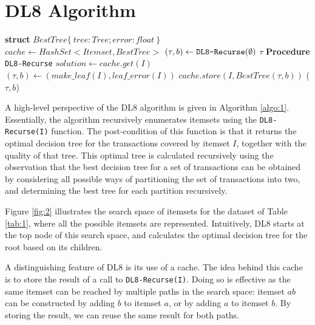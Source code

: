 \section{DL8 Algorithm}
\begin{algorithm}
	\DontPrintSemicolon
	\caption{$DL8(maxdepth, minsup)$}
	\label{algo:1}
	\textbf{struct} $BestTree\{\ tree : Tree; error : float\ \}$\;
	$cache \gets HashSet < Itemset, BestTree >$\;
	$(\tau, b) \gets \verb|DL8-Recurse|(\emptyset)$\;
	\Return $\tau$\;
	\textbf{Procedure} \texttt{DL8-Recurse}\;
		$solution \gets cache.get(I)$\;
		$(\tau, b) \gets (make\_leaf(I), leaf\_error (I))$\;
		$cache.store(I, BestT ree(\tau, b))$\;
		\Return($\tau, b$)\;
\end{algorithm}

A high-level perspective of the DL8 algorithm is given in Algorithm \ref{algo:1}. Essentially, the algorithm recursively enumerates itemsets using the \verb|DL8-Recurse(I)| function. The post-condition of this function is that it returns the optimal decision tree for the transactions covered by itemset $I$, together with the quality of that tree. This optimal tree is calculated recursively using the observation that the best decision tree for a set of transactions can be obtained by considering all possible ways of partitioning the set of transactions into two, and determining the best tree for each partition recursively.

Figure \ref{fig:2} illustrates the search space of itemsets for the dataset of Table \ref{tab:1}, where all the possible itemsets are represented. Intuitively, DL8 starts at the top node of this search space, and calculates the optimal decision tree for the root based on its children.

A distinguishing feature of DL8 is its use of a cache. The idea behind this cache is to store the result of a call to \verb|DL8-Recurse(I)|. Doing so is effective as the same itemset can be reached by multiple paths in the search space: itemset $ab$ can be constructed by adding $b$ to itemset $a$, or by adding $a$ to itemset $b$. By storing the result, we can reuse the same result for both paths.

